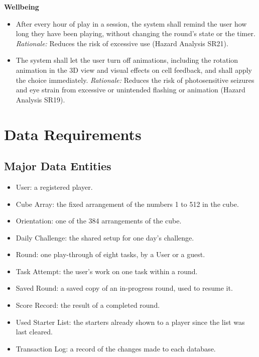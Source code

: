 \documentclass[12pt]{article}
\newcounter{reqnum} %
\begin{document}
\noindent \textbf{Wellbeing}
\begin{itemize}
 
\item[FR\refstepcounter{reqnum}\thereqnum \label{FR_PlayTimeReminder}:] After every hour of play in a session, the system shall remind the user how long they have been playing, without changing the round's state or the timer. \newline \textit{Rationale:} Reduces the risk of excessive use (Hazard Analysis SR21).
 
\item[FR\refstepcounter{reqnum}\thereqnum \label{FR_DisableAnimations}:] The system shall let the user turn off animations, including the rotation animation in the 3D view and visual effects on cell feedback, and shall apply the choice immediately. \newline \textit{Rationale:} Reduces the risk of photosensitive seizures and eye strain from excessive or unintended flashing or animation (Hazard Analysis SR19).
 
\end{itemize}
 
\section{Data Requirements}
 
\subsection{Major Data Entities}
 
\begin{itemize}
\item User: a registered player.
\item Cube Array: the fixed arrangement of the numbers 1 to 512 in the cube.
\item Orientation: one of the 384 arrangements of the cube.
\item Daily Challenge: the shared setup for one day's challenge.
\item Round: one play-through of eight tasks, by a User or a guest.
\item Task Attempt: the user's work on one task within a round.
\item Saved Round: a saved copy of an in-progress round, used to resume it.
\item Score Record: the result of a completed round.
\item Used Starter List: the starters already shown to a player since the list was last cleared.
\item Transaction Log: a record of the changes made to each database.
\end{itemize}
 
\end{document}
